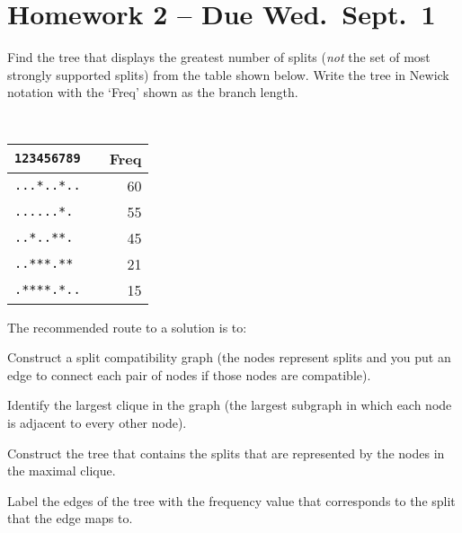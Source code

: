 \documentclass[11pt]{article}
\begin{document}
\section*{Homework 2 -- Due Wed.~Sept.~1}
{
\Large
Find the tree that displays the greatest number of splits ({\em not} the set of most strongly supported splits) from the table shown below.
Write the tree in Newick notation with the `Freq' shown as the branch length.
\begin{center}
{\tt 
\begin{tabular}{|lp{0.1cm}r|}
\hline
{\tt 123456789} & & Freq \\
\hline
{\tt ...*..*..} & & 60 \\
{\tt *......*.} & & 55 \\
{\tt *..*..**.} & & 45 \\
{\tt *..***.**} & & 21 \\
{\tt .****.*..} & & 15 \\
\hline
\end{tabular}
}
\end{center}
The recommended route to a solution is to:
\begin{compactenum}
	\item Construct a split compatibility graph (the nodes represent splits and you put an edge to connect each pair of nodes if those nodes are compatible).
	\item Identify the largest clique in the graph (the largest subgraph in which each node is adjacent to every other node).
	\item Construct the tree that contains the splits that are represented by the nodes in the maximal clique.
	\item Label the edges of the tree with the frequency value that corresponds to the split that the edge maps to.
\end{compactenum}
}
\end{document}
